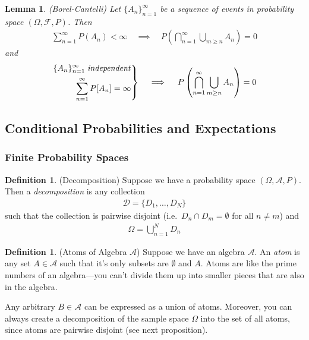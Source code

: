 \documentclass[12pt]{article}
\theoremstyle{plain}
\newtheorem{lem}[thm]{Lemma}
\theoremstyle{definition}
\newtheorem{defn}[thm]{Definition}
\theoremstyle{remark}
\newcommand{\sF}{\mathscr{F}}
\newcommand{\sD}{\mathscr{D}}
\newcommand{\sA}{\mathscr{A}}
\newenvironment{rcases}
  {\left.\begin{aligned}}
  {\end{aligned}\right\rbrace}
\newcommand{\sumninf}{\sum^\infty_{n=1}}
\newcommand{\ninf}{_{n=1}^\infty}
\newcommand{\nN}{_{n=1}^N}
\begin{document}
\begin{lem}\emph{(Borel-Cantelli)}
Let $\{A_n\}\ninf$ be a sequence of events in probability space
$(\Omega,\sF,P)$. Then
\begin{align*}
  \sumninf P(A_n) < \infty
  \quad\implies\quad
  P\left(\bigcap\ninf \bigcup_{m\geq n} A_n\right) = 0
\end{align*}
and
\begin{align*}
  \begin{rcases}
    \{A_n\}\ninf \; \text{\emph{independent}}\\
    \sumninf P[A_n] = \infty
  \end{rcases}
  \quad\implies\quad
  P\left(\bigcap\ninf \bigcup_{m\geq n} A_n\right) = 0
\end{align*}
\end{lem}

\clearpage
\subsection{Conditional Probabilities and Expectations}

\subsubsection{Finite Probability Spaces}

\begin{defn}(Decomposition)
Suppose we have a probability space $(\Omega,\sA,P)$. Then a
\emph{decomposition} is any collection
\begin{align*}
  \sD = \{D_1,\ldots,D_N\}
\end{align*}
such that the collection is pairwise disjoint (i.e.\
$D_n\cap D_m=\emptyset$ for all $n\neq m$) and
\begin{align*}
  \Omega = \bigcup\nN D_n
\end{align*}
\end{defn}

\begin{defn}(Atoms of Algebra $\sA$)
Suppose we have an algebra $\sA$. An \emph{atom} is any set $A\in \sA$
such that it's only subsets are $\emptyset$ and $A$.
Atoms are like the prime numbers of an algebra---you can't divide them
up into smaller pieces that are also in the algebra.

Any arbitrary $B\in\sA$ can be expressed as a union of atoms. Moreover,
you can always create a decomposition of the sample space $\Omega$ into
the set of all atoms, since atoms are pairwise disjoint (see next
proposition).
\end{defn}
\end{document}
